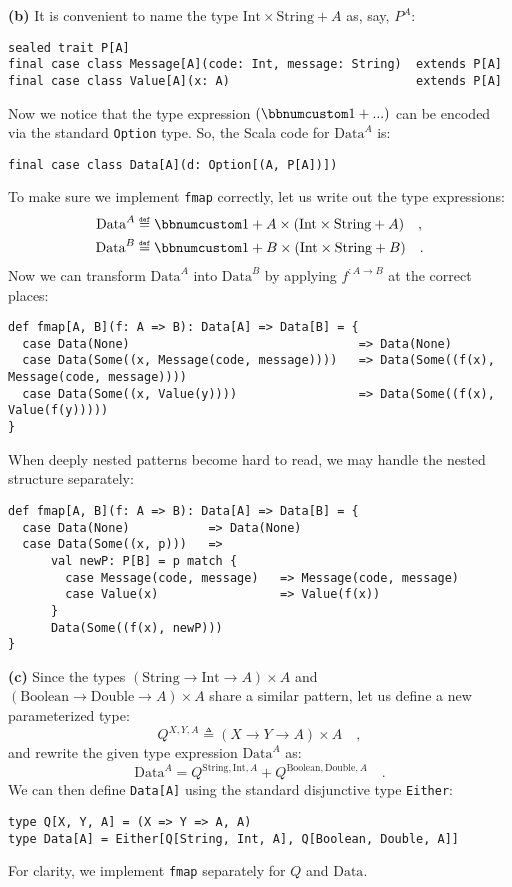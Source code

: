 \textbf{(b)} It is convenient to name the type $\text{Int}\times\text{String}+A$
as, say, $P^{A}$:
\begin{lstlisting}
sealed trait P[A]
final case class Message[A](code: Int, message: String)  extends P[A]
final case class Value[A](x: A)                          extends P[A]
\end{lstlisting}
Now we notice that the type expression $\left(\bbnum 1+...\right)$
can be encoded via the standard \lstinline!Option! type. So, the
Scala code for $\text{Data}^{A}$ is:
\begin{lstlisting}
final case class Data[A](d: Option[(A, P[A])])
\end{lstlisting}
To make sure we implement \lstinline!fmap! correctly, let us write
out the type expressions:
\begin{align*}
\text{Data}^{A} & \triangleq\bbnum 1+A\times(\text{Int}\times\text{String}+A)\quad,\\
\text{Data}^{B} & \triangleq\bbnum 1+B\times(\text{Int}\times\text{String}+B)\quad.
\end{align*}
Now we can transform $\text{Data}^{A}$ into $\text{Data}^{B}$ by
applying $f^{:A\rightarrow B}$ at the correct places:
\begin{lstlisting}
def fmap[A, B](f: A => B): Data[A] => Data[B] = {
  case Data(None)                                => Data(None)
  case Data(Some((x, Message(code, message))))   => Data(Some((f(x), Message(code, message))))
  case Data(Some((x, Value(y))))                 => Data(Some((f(x), Value(f(y)))))
}
\end{lstlisting}
When deeply nested patterns become hard to read, we may handle the
nested structure separately:
\begin{lstlisting}
def fmap[A, B](f: A => B): Data[A] => Data[B] = {
  case Data(None)           => Data(None)
  case Data(Some((x, p)))   =>
      val newP: P[B] = p match {
        case Message(code, message)   => Message(code, message)
        case Value(x)                 => Value(f(x))
      }
      Data(Some((f(x), newP)))
}
\end{lstlisting}

\textbf{(c)} Since the types $(\text{String}\rightarrow\text{Int}\rightarrow A)\times A$
and $(\text{Boolean}\rightarrow\text{Double}\rightarrow A)\times A$
share a similar pattern, let us define a new parameterized type:
\[
Q^{X,Y,A}\triangleq\left(X\rightarrow Y\rightarrow A\right)\times A\quad,
\]
and rewrite the given type expression $\text{Data}^{A}$ as:
\[
\text{Data}^{A}=Q^{\text{String},\text{Int},A}+Q^{\text{Boolean},\text{Double},A}\quad.
\]
We can then define \lstinline!Data[A]! using the standard disjunctive
type \lstinline!Either!: 
\begin{lstlisting}
type Q[X, Y, A] = (X => Y => A, A)
type Data[A] = Either[Q[String, Int, A], Q[Boolean, Double, A]]
\end{lstlisting}
For clarity, we implement \lstinline!fmap! separately for $Q$ and
$\text{Data}$.

